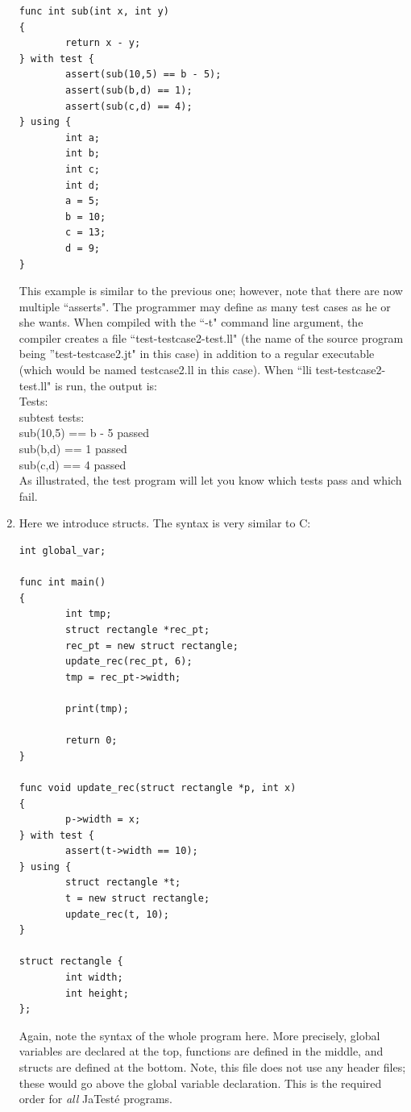 \documentclass{article}
\begin{document}
\begin{enumerate}
\begin{lstlisting}
func int sub(int x, int y)
{
        return x - y;
} with test {
        assert(sub(10,5) == b - 5);
        assert(sub(b,d) == 1);
        assert(sub(c,d) == 4);
} using {
        int a;
        int b;
        int c;
        int d;
        a = 5;
        b = 10;
        c = 13;
        d = 9;
}
\end{lstlisting}
This example is similar to the previous one; however, note that there are now multiple ``asserts". The programmer may define as many test cases as he or she wants. When compiled with the ``-t" command line argument, the compiler creates a file ``test-testcase2-test.ll" (the name of the source program being ''test-testcase2.jt" in this case) in addition to a regular executable (which would be named testcase2.ll in this case).  
When ``lli test-testcase2-test.ll" is run, the output is: \\
Tests: \\
subtest tests: \\
sub(10,5) == b - 5 passed \\
sub(b,d) == 1 passed \\
sub(c,d) == 4 passed \\
As illustrated, the test program will let you know which tests pass and which fail.
\item

Here we introduce structs. The syntax is very similar to C: \\

\begin{lstlisting}
int global_var;

func int main()
{
        int tmp;
        struct rectangle *rec_pt;
        rec_pt = new struct rectangle;
        update_rec(rec_pt, 6);
        tmp = rec_pt->width;

        print(tmp);

        return 0;
}

func void update_rec(struct rectangle *p, int x)
{
        p->width = x;
} with test {
        assert(t->width == 10);
} using {
        struct rectangle *t;
        t = new struct rectangle;
        update_rec(t, 10);
}

struct rectangle {
        int width;
        int height;
};
\end{lstlisting}
Again, note the syntax of the whole program here. More precisely, global variables are declared at the top, functions are defined in the middle, and structs are defined at the bottom. Note, this file does not use any header files; these would go above the global variable declaration. This is the required order for \emph{all} JaTest\'{e} programs. 


\end{enumerate}
\end{document}
